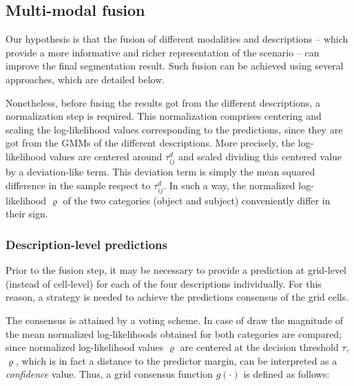 \documentclass[10pt,twocolumn,letterpaper]{article}
\begin{document}
\subsection{Multi-modal fusion} 
\label{ssec:fusion}

Our hypothesis is that the fusion of different modalities and descriptions -- which provide a more informative and richer representation of the scenario -- can improve the final segmentation result. Such fusion can be achieved using several approaches, which are detailed below.
 
Nonetheless, before fusing the results got from the different descriptions, a normalization step is required. This normalization comprises centering and scaling the log-likelihood values corresponding to the predictions, since they are got from the GMMs of the different descriptions. More precisely, the log-likelihood values are centered around $\tau_{ij}^{d}$ and scaled dividing this centered value by a deviation-like term. This deviation term is simply the mean squared difference in the sample respect to $\tau_{ij}^{d}$. In such a way, the normalized log-likelihood $\varrho$ of the two categories (object and subject) conveniently differ in their sign.

\subsubsection{Description-level predictions}
\label{sssec:descriptionlevelpredictions}

Prior to the fusion step, it may be necessary to provide a prediction at grid-level (instead of cell-level) for each of the four descriptions individually. For this reason, a strategy is needed to achieve the predictions consensus of the grid cells. 

The consensus is attained by a voting scheme. In case of draw the magnitude of the mean normalized log-likelihoods obtained for both categories are compared; since normalized log-likelihood values $\varrho$ are centered at the decision threshold $\tau$, $\varrho$, which is in fact a distance to the predictor margin, can be interpreted as a \textit{confidence} value. Thus, a grid consensus function $g(\cdot)$ is defined as follows:
\end{document}
